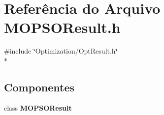 \section{Referência do Arquivo M\+O\+P\+S\+O\+Result.\+h}
\label{_m_o_p_s_o_result_8h}
{\ttfamily \#include \char`\"{}Optimization/\+Opt\+Result.\+h\char`\"{}}\\*
\subsection*{Componentes}
\begin{DoxyCompactItemize}
\item 
class {\bf M\+O\+P\+S\+O\+Result}
\end{DoxyCompactItemize}
